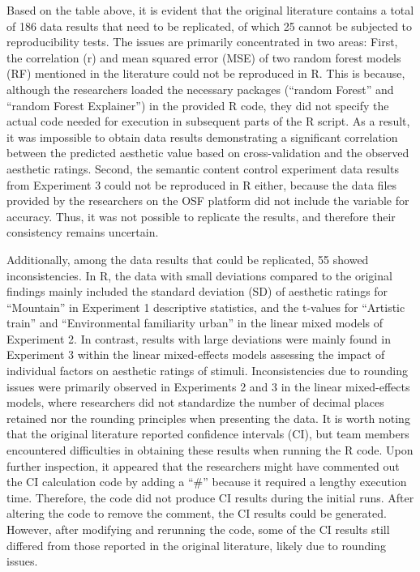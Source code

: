 \documentclass[
  man,floatsintext]{apa6}
\begin{document}
Based on the table above, it is evident that the original literature contains a total of 186 data results that need to be replicated, of which 25 cannot be subjected to reproducibility tests. The issues are primarily concentrated in two areas: First, the correlation (r) and mean squared error (MSE) of two random forest models (RF) mentioned in the literature could not be reproduced in R. This is because, although the researchers loaded the necessary packages (``random Forest'' and ``random Forest Explainer'') in the provided R code, they did not specify the actual code needed for execution in subsequent parts of the R script. As a result, it was impossible to obtain data results demonstrating a significant correlation between the predicted aesthetic value based on cross-validation and the observed aesthetic ratings. Second, the semantic content control experiment data results from Experiment 3 could not be reproduced in R either, because the data files provided by the researchers on the OSF platform did not include the variable for accuracy. Thus, it was not possible to replicate the results, and therefore their consistency remains uncertain.

Additionally, among the data results that could be replicated, 55 showed inconsistencies. In R, the data with small deviations compared to the original findings mainly included the standard deviation (SD) of aesthetic ratings for ``Mountain'' in Experiment 1 descriptive statistics, and the t-values for ``Artistic train'' and ``Environmental familiarity urban'' in the linear mixed models of Experiment 2. In contrast, results with large deviations were mainly found in Experiment 3 within the linear mixed-effects models assessing the impact of individual factors on aesthetic ratings of stimuli. Inconsistencies due to rounding issues were primarily observed in Experiments 2 and 3 in the linear mixed-effects models, where researchers did not standardize the number of decimal places retained nor the rounding principles when presenting the data. It is worth noting that the original literature reported confidence intervals (CI), but team members encountered difficulties in obtaining these results when running the R code. Upon further inspection, it appeared that the researchers might have commented out the CI calculation code by adding a ``\#'' because it required a lengthy execution time. Therefore, the code did not produce CI results during the initial runs. After altering the code to remove the comment, the CI results could be generated. However, after modifying and rerunning the code, some of the CI results still differed from those reported in the original literature, likely due to rounding issues.
\end{document}
